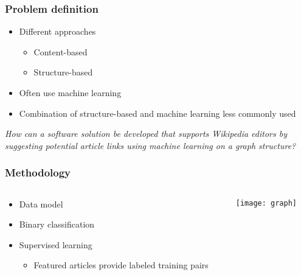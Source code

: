 \begin{frame}
    \frametitle{Problem definition}
    \centering
    \begin{itemize}
      \item Different approaches
        \begin{itemize}
          \item Content-based
          \item Structure-based
        \end{itemize}
      \item Often use machine learning
      \item Combination of structure-based and machine learning less commonly used
    \end{itemize}
    \emph{How can a software solution be developed that supports Wikipedia editors by suggesting potential article links using machine learning on a graph structure?}
\end{frame}

\begin{frame}
    \frametitle{Methodology}
    \begin{columns}[T]
      \begin{column}{0.55\textwidth}
        \begin{itemize}
          \item Data model
          \item Binary classification
          \item Supervised learning
            \begin{itemize}
              \item Featured articles provide labeled training pairs
            \end{itemize}
        \end{itemize}
      \end{column}
      \begin{column}{0.45\textwidth}
        \texttt{[image: graph]}
      \end{column}
    \end{columns}

\end{frame}

